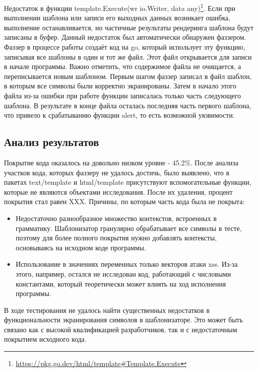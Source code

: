 \documentclass[a4paper]{article}
\begin{document}
Недостаток в функции template.Execute(wr io.Writer, data any)\footnote{\href{https://pkg.go.dev/html/template\#Template.Execute}{https://pkg.go.dev/html/template\#Template.Execute}}. Если при выполнении шаблона или записи его выходных данных возникает ошибка, выполнение останавливается, но частичные результаты рендеринга шаблона будут записаны в буфер. Данный недостаток был автоматически обнаружен фаззером. Фаззер в процессе работы создаёт код на go, который использует эту функцию, записывая все шаблоны в один и тот же файл. Этот файл открывается для записи в начале программы. Важно отметить, что содержимое файла не очищается, а  переписывается новым шаблоном. Первым шагом фаззер записал в файл шаблон, в которым все символы были корректно экранированы. Затем в начало этого файла из-за ошибки при работе функции записалась только часть следующего шаблона. В результате в конце файла осталась последняя часть первого шаблона, что привело к срабатыванию функции alert, то есть возможной уязвимости. 

\subsection{Анализ результатов}

Покрытие кода оказалось на довольно низком уровне - 45.2\%. После анализа участков кода, которых фаззеру не удалось достичь, было выявлено, что в пакетах text/template и html/template присутствуют вспомогательные функции, которые не являются объектами исследования. После их удаления, процент покрытия стал равен XXX.
Причины, по которым часть кода была не покрыта:
\begin{itemize}
    \item Недостаточно разнообразное множество контекстов, встроенных в грамматику. Шаблонизатор гранулярно обрабатывает все символы в тесте, поэтому для более полного покрытия нужно добавлять контексты, основываясь на исходном коде программы.
    \item Использование в значениях переменных только векторов атаки xss. Из-за этого, например, остался не исследован код, работающий с числовыми константами, который теоретически может влиять на ход исполнения программы.
\end{itemize}

В ходе тестирования не удалось найти существенных недостатков в функциональности экранирования символов в шаблонизаторе. Это может быть связано как с высокой квалификацией разработчиков, так и с недостаточным покрытием исходного кода.
\end{document}
